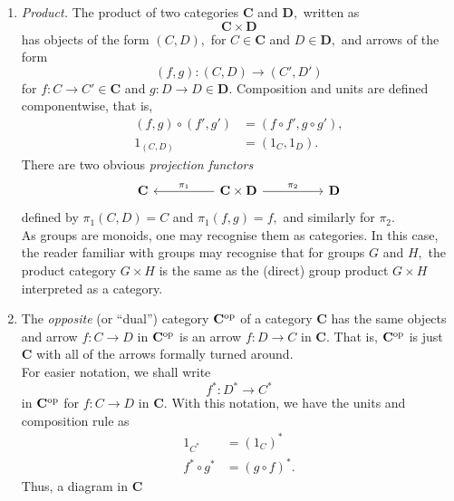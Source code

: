 \begin{enumerate}
	\item \emph{Product.} The product of two categories $\mathbf{C}$ and $\mathbf{D},$ written as
	\begin{equation*} 
		\mathbf{C} \times \mathbf{D}
	\end{equation*}
	has objects of the form $(C, D),$ for $C \in \mathbf{C}$ and $D \in \mathbf{D},$ and arrows of the form
	\begin{equation*} 
		(f, g) : (C, D) \to (C', D')
	\end{equation*}
	for $f: C \to C' \in \mathbf{C}$ and $g:D\to D\in \mathbf{D}.$ Composition and units are defined componentwise, that is,
	\begin{align*} 
		(f, g) \circ (f', g') &= (f\circ f', g\circ g'),\\
		1_{(C, D)} &= (1_C, 1_D).
	\end{align*}
	There are two obvious \emph{projection functors}
	\begin{equation*} 
		\begin{tikzcd}
			\mathbf{C} && \mathbf{C}\times\mathbf{D} \arrow[rr, "\pi_2"] \arrow[ll, "\pi_1"'] && \mathbf{D}
		\end{tikzcd}
	\end{equation*}
	defined by $\pi_1(C, D) = C$ and $\pi_1(f, g) = f,$ and similarly for $\pi_2.$\\
	As groups are monoids, one may recognise them as categories. In this case, the reader familiar with groups may recognise that for groups $G$ and $H,$ the product category $G\times H$ is the same as the (direct) group product $G \times H$ interpreted as a category.
	\item The \emph{opposite} (or ``dual'') category $\mathbf{C}^{\operatorname{op}}$ of a category $\mathbf{C}$ has the same objects and arrow $f:C\to D$ in $\mathbf{C}^{\operatorname{op}}$ is an arrow $f:D\to C$ in $\mathbf{C}.$ That is, $\mathbf{C}^{\operatorname{op}}$ is just $\mathbf{C}$ with all of the arrows formally turned around.\\
	For easier notation, we shall write
	\begin{equation*} 
		f^* : D^* \to C^*
	\end{equation*}
	in $\mathbf{C}^{\operatorname{op}}$ for $f:C\to D$ in $\mathbf{C}.$ With this notation, we have the units and composition rule as
	\begin{align*} 
		1_{C^*} &= (1_C)^*\\
		f^*\circ g^* &= (g \circ f)^*.
	\end{align*}
	Thus, a diagram in $\mathbf{C}$

\end{enumerate}

